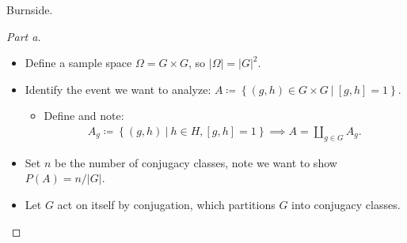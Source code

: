 \begin{strategy}

Burnside.

\end{strategy}

\begin{solution}

\envlist

\begin{proof}[Part a]

\envlist

\begin{itemize}
\item
  Define a sample space \(\Omega = G \times G\), so
  \({\left\lvert {\Omega} \right\rvert} = {\left\lvert {G} \right\rvert}^2\).
\item
  Identify the event we want to analyze:
  \(A \coloneqq\left\{{(g,h) \in G\times G {~\mathrel{\Big|}~}[g,h] = 1}\right\}\).

  \begin{itemize}
  \tightlist
  \item
    Define and note:
    \begin{align*}
    A_g \coloneqq\left\{{(g, h) {~\mathrel{\Big|}~}h\in H, [g, h] = 1}\right\} \implies A = {\coprod}_{g\in G} A_g
    .\end{align*}
  \end{itemize}
\item
  Set \(n\) be the number of conjugacy classes, note we want to show
  \(P(A) = n / {\left\lvert {G} \right\rvert}\).
\item
  Let \(G\) act on itself by conjugation, which partitions \(G\) into
  conjugacy classes.


\end{itemize}
\end{proof}
\end{solution}
